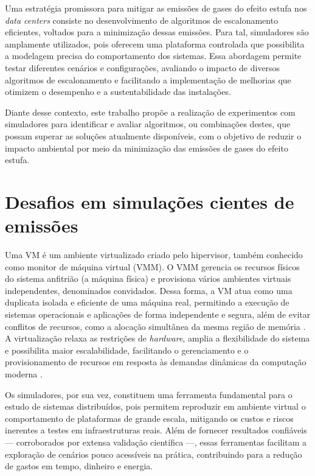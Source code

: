 \documentclass[12pt]{article}
\begin{document}
Uma estratégia promissora para mitigar as emissões de gases do efeito estufa nos \textit{data centers} consiste no desenvolvimento de algoritmos de escalonamento eficientes, voltados para a minimização dessas emissões. Para tal, simuladores são amplamente utilizados, pois oferecem uma plataforma controlada que possibilita a modelagem precisa do comportamento dos sistemas. Essa abordagem permite testar diferentes cenários e configurações, avaliando o impacto de diversos algoritmos de escalonamento e facilitando a implementação de melhorias que otimizem o desempenho e a sustentabilidade das instalações.

Diante desse contexto, este trabalho propõe a realização de experimentos com simuladores para identificar e avaliar algoritmos, ou combinações destes, que possam superar as soluções atualmente disponíveis, com o objetivo de reduzir o impacto ambiental por meio da minimização das emissões de gases do efeito estufa.

\section{Desafios em simulações cientes de emissões} \label{sec:firstpage}

Uma VM é um ambiente virtualizado criado pelo hipervisor, também conhecido como monitor de máquina virtual (VMM). O VMM gerencia os recursos físicos do sistema anfitrião (a máquina física) e provisiona vários ambientes virtuais independentes, denominados convidados. Dessa forma, a VM atua como uma duplicata isolada e eficiente de uma máquina real, permitindo a execução de sistemas operacionais e aplicações de forma independente e segura, além de evitar conflitos de recursos, como a alocação simultânea da mesma região de memória \cite{popek:74}. A virtualização relaxa as restrições de \textit{hardware}, amplia a flexibilidade do sistema e possibilita maior escalabilidade, facilitando o gerenciamento e o provisionamento de recursos em resposta às demandas dinâmicas da computação moderna \cite{buyya:13}.

Os simuladores, por sua vez, constituem uma ferramenta fundamental para o estudo de sistemas distribuídos, pois permitem reproduzir em ambiente virtual o comportamento de plataformas de grande escala, mitigando os custos e riscos inerentes a testes em infraestruturas reais. Além de fornecer resultados confiáveis --- corroborados por extensa validação científica ---, essas ferramentas facilitam a exploração de cenários pouco acessíveis na prática, contribuindo para a redução de gastos em tempo, dinheiro e energia.
\end{document}
